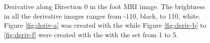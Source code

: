 \documentclass{InsightArticle}
\begin{document}
\begin{figure}
\begin{center}
  \end{center}
  \caption[MRI foot derivative.]{Derivative along Direction 0 in the foot MRI
  image.
  The brightness in all the derivative images ranges from
  -110, black, to 110, white.  Figure \ref{fig:deriv-a} was created with the
   while Figure \ref{fig:deriv-b} to
  \ref{fig:deriv-f} were created with the
   with the
   set from 1 to 5.}
  \label{fig:derivative}
\end{figure}
\end{document}

